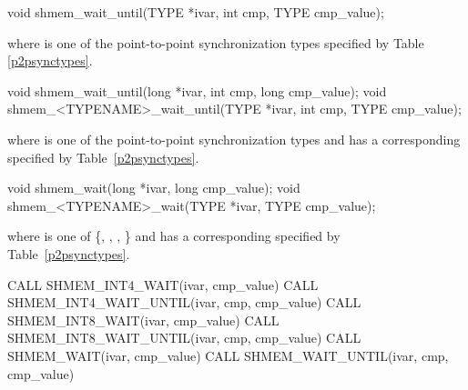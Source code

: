 
\begin{apidefinition}

\begin{C11synopsis}
void shmem_wait_until(TYPE *ivar, int cmp, TYPE cmp_value);
\end{C11synopsis}
where \TYPE{} is one of the point-to-point synchronization types specified by
Table \ref{p2psynctypes}.

\begin{Csynopsis}
void shmem_wait_until(long *ivar, int cmp, long cmp_value);
void shmem_<TYPENAME>_wait_until(TYPE *ivar, int cmp, TYPE cmp_value);
\end{Csynopsis}
where \TYPE{} is one of the point-to-point synchronization types and has a
corresponding \TYPENAME{} specified by Table~\ref{p2psynctypes}.

\begin{DeprecateBlock}
\begin{CsynopsisCol}
void shmem_wait(long *ivar, long cmp_value);
void shmem_<TYPENAME>_wait(TYPE *ivar, TYPE cmp_value);
\end{CsynopsisCol}
where \TYPE{} is one of \{, , ,
\} and has a corresponding \TYPENAME{} specified by
Table~\ref{p2psynctypes}.
\end{DeprecateBlock}

\begin{Fsynopsis}
CALL SHMEM_INT4_WAIT(ivar, cmp_value)
CALL SHMEM_INT4_WAIT_UNTIL(ivar, cmp, cmp_value)
CALL SHMEM_INT8_WAIT(ivar, cmp_value)
CALL SHMEM_INT8_WAIT_UNTIL(ivar, cmp, cmp_value)
CALL SHMEM_WAIT(ivar, cmp_value)
CALL SHMEM_WAIT_UNTIL(ivar, cmp, cmp_value)
\end{Fsynopsis}

\begin{apiarguments}



\end{apiarguments}
\end{apidefinition}
